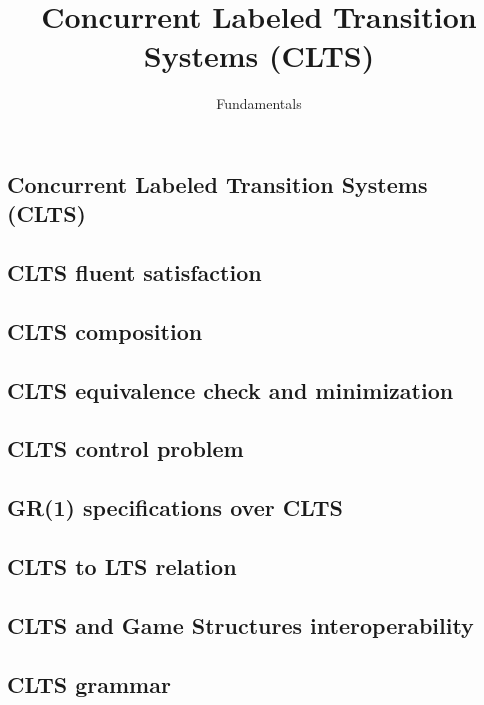 \documentclass{article}
\title{Concurrent Labeled Transition Systems (CLTS)} %
\author{Fundamentals} %
\date{}
\begin{document}
\maketitle

\setcounter{section}{1} %
\setcounter{theorem}{1} %

\subsection{Concurrent Labeled Transition Systems (CLTS)}


\subsection{CLTS fluent satisfaction}


\subsection{CLTS composition}


\newpage
\subsection{CLTS equivalence check and minimization}


\newpage
\subsection{CLTS control problem}


\newpage
\subsection{GR(1) specifications over CLTS}


\newpage
\subsection{CLTS to LTS relation}


\newpage
\subsection{CLTS and Game Structures interoperability}


\subsection{CLTS grammar}

\newpage


\end{document}
